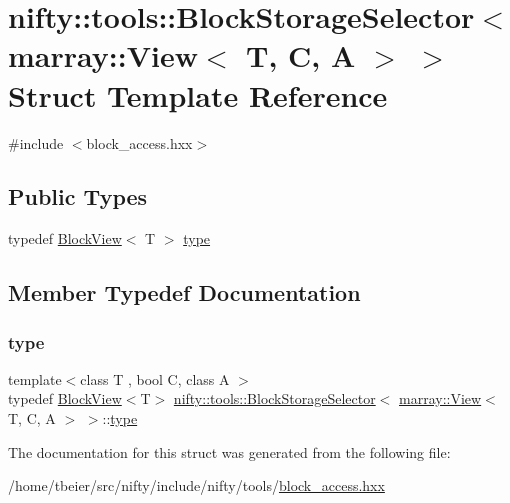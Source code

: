 \hypertarget{structnifty_1_1tools_1_1BlockStorageSelector_3_01marray_1_1View_3_01T_00_01C_00_01A_01_4_01_4}{}\section{nifty\+:\+:tools\+:\+:Block\+Storage\+Selector$<$ marray\+:\+:View$<$ T, C, A $>$ $>$ Struct Template Reference}
\label{structnifty_1_1tools_1_1BlockStorageSelector_3_01marray_1_1View_3_01T_00_01C_00_01A_01_4_01_4}


{\ttfamily \#include $<$block\+\_\+access.\+hxx$>$}

\subsection*{Public Types}
\begin{DoxyCompactItemize}
\item 
typedef \hyperlink{classnifty_1_1tools_1_1BlockView}{Block\+View}$<$ T $>$ \hyperlink{structnifty_1_1tools_1_1BlockStorageSelector_3_01marray_1_1View_3_01T_00_01C_00_01A_01_4_01_4_a23f0abbf6c69d9fd6db3d19d7de5c261}{type}
\end{DoxyCompactItemize}


\subsection{Member Typedef Documentation}
\mbox{\label{structnifty_1_1tools_1_1BlockStorageSelector_3_01marray_1_1View_3_01T_00_01C_00_01A_01_4_01_4_a23f0abbf6c69d9fd6db3d19d7de5c261}} 
\subsubsection{\texorpdfstring{type}{type}}
{\footnotesize\ttfamily template$<$class T , bool C, class A $>$ \\
typedef \hyperlink{classnifty_1_1tools_1_1BlockView}{Block\+View}$<$T$>$ \hyperlink{structnifty_1_1tools_1_1BlockStorageSelector}{nifty\+::tools\+::\+Block\+Storage\+Selector}$<$ \hyperlink{classandres_1_1View}{marray\+::\+View}$<$ T, C, A $>$ $>$\+::\hyperlink{structnifty_1_1tools_1_1BlockStorageSelector_3_01marray_1_1View_3_01T_00_01C_00_01A_01_4_01_4_a23f0abbf6c69d9fd6db3d19d7de5c261}{type}}



The documentation for this struct was generated from the following file\+:\begin{DoxyCompactItemize}
\item 
/home/tbeier/src/nifty/include/nifty/tools/\hyperlink{block__access_8hxx}{block\+\_\+access.\+hxx}\end{DoxyCompactItemize}
